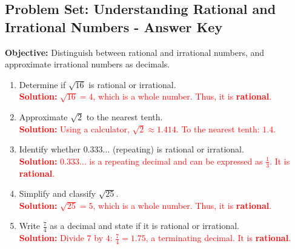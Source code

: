 \documentclass[10pt]{article}
\title{}
\date{}
\begin{document}
\subsection*{Problem Set: Understanding Rational and Irrational Numbers - Answer Key}
\onehalfspacing

\begin{tcolorbox}[colframe=black!40, colback=gray!5, 
coltitle=black, colbacktitle=black!20, fonttitle=\bfseries\Large, 
title=Learning Objective, halign title=center, left=5pt, right=5pt, top=5pt, bottom=15pt]
\textbf{Objective:} Distinguish between rational and irrational numbers, and approximate irrational numbers as decimals.
\end{tcolorbox}

\begin{tcolorbox}[colframe=black!60, colback=white, 
coltitle=black, colbacktitle=black!15, fonttitle=\bfseries\Large, 
title=Exercises, halign title=center, left=10pt, right=10pt, top=10pt, bottom=60pt]
\begin{enumerate}[itemsep=3em]
    \item Determine if \( \sqrt{16} \) is rational or irrational.\\
    \textcolor{red}{\textbf{Solution:} \( \sqrt{16} = 4 \), which is a whole number. Thus, it is \textbf{rational}.}

    \item Approximate \( \sqrt{2} \) to the nearest tenth.\\
    \textcolor{red}{\textbf{Solution:} Using a calculator, \( \sqrt{2} \approx 1.414 \). To the nearest tenth: \(1.4\).}

    \item Identify whether \( 0.333\ldots \) (repeating) is rational or irrational.\\
    \textcolor{red}{\textbf{Solution:} \( 0.333\ldots \) is a repeating decimal and can be expressed as \( \frac{1}{3} \). It is \textbf{rational}.}

    \item Simplify and classify \( \sqrt{25} \).\\
    \textcolor{red}{\textbf{Solution:} \( \sqrt{25} = 5 \), which is a whole number. Thus, it is \textbf{rational}.}

    \item Write \( \frac{7}{4} \) as a decimal and state if it is rational or irrational.\\
    \textcolor{red}{\textbf{Solution:} Divide \(7\) by \(4\): \( \frac{7}{4} = 1.75 \), a terminating decimal. It is \textbf{rational}.}


\end{enumerate}
\end{tcolorbox}
\end{document}
